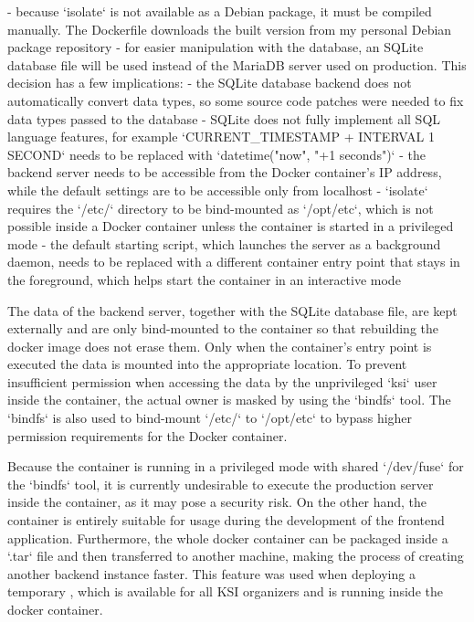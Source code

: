 \documentclass[
  digital, %
  oneside, %
  lof,     %
  nolot,     %
]{fithesis4}
\begin{document}
{- because `isolate` is not available as a Debian package, it must be compiled manually. The Dockerfile downloads the built version from my personal Debian package repository
- for easier manipulation with the database, an SQLite database file will be used instead of the MariaDB server used on production. This decision has a few implications:
    - the SQLite database backend does not automatically convert data types, so some source code patches were needed to fix data types passed to the database
    - SQLite does not fully implement all SQL language features, for example `CURRENT_TIMESTAMP + INTERVAL 1 SECOND` needs to be replaced with `datetime("now", "+1 seconds")`
- the backend server needs to be accessible from the Docker container's IP address, while the default settings are to be accessible only from localhost
- `isolate` requires the `/etc/` directory to be bind-mounted as `/opt/etc`, which is not possible inside a Docker container unless the container is started in a privileged mode
- the default starting script, which launches the server as a background daemon, needs to be replaced with a different container entry point that stays in the foreground, which helps start the container in an interactive mode

The data of the backend server, together with the SQLite database file, are kept externally and are only bind-mounted to the container so that rebuilding the docker image does not erase them. Only when the container's entry point is executed the data is mounted into the appropriate location. To prevent insufficient permission when accessing the data by the unprivileged `ksi` user inside the container, the actual owner is masked by using the `bindfs` tool. The `bindfs` is also used to bind-mount `/etc/` to `/opt/etc` to bypass higher permission requirements for the Docker container. 

Because the container is running in a privileged mode with shared `/dev/fuse` for the `bindfs` tool, it is currently undesirable to execute the production server inside the container, as it may pose a security risk. On the other hand, the container is entirely suitable for usage during the development of the frontend application. Furthermore, the whole docker container can be packaged inside a `.tar` file and then transferred to another machine, making the process of creating another backend instance faster. This feature was used when deploying a temporary , which is available for all KSI organizers and is running inside the docker container.

}
\end{document}
